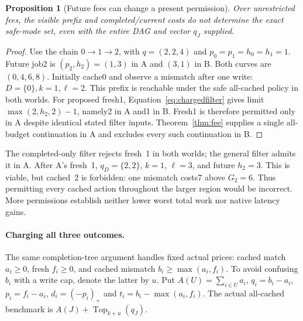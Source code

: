 \documentclass[acmsmall,screen,review,anonymous]{acmart}
\newtheorem{proposition}[theorem]{Proposition}
\begin{document}
\begin{proposition}[Future fees can change a present permission]
\label{prop:futurefees}
Over unrestricted fees, the visible prefix and completed/current costs do not determine the exact safe-mode set, even with the entire DAG and vector $q_J$ supplied.
\end{proposition}
\begin{proof}
Use the chain $0\to1\to2$, with $q=(2,2,4)$ and $p_0=p_1=h_0=h_1=1$. Future job2 is $(p_2,h_2)=(1,3)$ in A and $(3,1)$ in B. Both curves are $(0,4,6,8)$. Initially cache0 and observe a mismatch after one write: $D=\{0\},k=1,\ell=2$. This prefix is reachable under the safe all-cached policy in both worlds. For proposed fresh1, Equation~\eqref{eq:chargedfilter} gives limit $\max(2,h_2,2)-1$, namely2 in A and1 in B. Fresh1 is therefore permitted only in A despite identical stated filter inputs. Theorem~\ref{thm:fee} supplies a single all-budget continuation in A and excludes every such continuation in B.
\end{proof}

The completed-only filter rejects fresh~1 in both worlds; the general filter admits it in A. After A's fresh~1, $q_D=\{2,2\}$, $k=1$, $\ell=3$, and future $h_2=3$. This is viable, but cached~2 is forbidden: one mismatch costs7 above $G_2=6$. Thus permitting every cached action throughout the larger region would be incorrect. More permissions establish neither lower worst total work nor native latency gains.

\paragraph{Charging all three outcomes.}
The same completion-tree argument handles fixed actual prices: cached match $a_i\ge0$, fresh $f_i\ge0$, and cached mismatch $b_i\ge\max(a_i,f_i)$. To avoid confusing $b_i$ with a write cap, denote the latter by $u$. Put $A(U)=\sum_{i\in U}a_i$, $q_i=b_i-a_i$, $p_i=f_i-a_i$, $d_i=(-p_i)_+$ and $t_i=b_i-\max(a_i,f_i)$. The actual all-cached benchmark is $A(J)+\operatorname{Top}_{k+u}(q_J)$.
\end{document}
